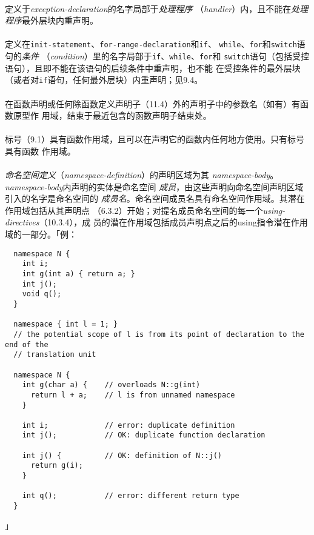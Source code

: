 \paragraph{}
定义于\textit{exception-declaration}的名字局部于\textit{处理程序}
（\textit{handler}）内，且不能在\textit{处理程序}最外层块内重声明。

\paragraph{}
定义在\texttt{init-statement}、\texttt{for-range-declaration}和\texttt{if}、
\texttt{while}、\texttt{for}和\texttt{switch}语句的\textit{条件}
（\textit{condition}）里的名字局部于\texttt{if}、\texttt{while}、\texttt{for}和
\texttt{switch}语句（包括受控语句），且即不能在该语句的后续条件中重声明，也不能
在受控条件的最外层块（或者对\texttt{if}语句，任何最外层块）内重声明；见9.4。

\paragraph{}
在函数声明或任何除函数定义声明子（11.4）外的声明子中的参数名（如有）有函数原型作
用域，结束于最近包含的函数声明子结束处。

\paragraph{}
标号（9.1）具有函数作用域，且可以在声明它的函数内任何地方使用。只有标号具有函数
作用域。

\paragraph{}
\textit{命名空间定义}（\textit{namespace-definition}）的声明区域为其
\textit{namespace-body}。\textit{namespace-body}内声明的实体是命名空间
\textit{成员}，由这些声明向命名空间声明区域引入的名字是命名空间的
\textit{成员名}。命名空间成员名具有命名空间作用域。其潜在作用域包括从其声明点
（6.3.2）开始；对提名成员命名空间的每一个\textit{using-directives}（10.3.4），成
员的潜在作用域包括成员声明点之后的using指令潜在作用域的一部分。「例：
\begin{lstlisting}
  namespace N {
    int i;
    int g(int a) { return a; }
    int j();
    void q();
  }

  namespace { int l = 1; }
  // the potential scope of l is from its point of declaration to the end of the
  // translation unit

  namespace N {
    int g(char a) {    // overloads N::g(int)
      return l + a;    // l is from unnamed namespace
    }

    int i;             // error: duplicate definition
    int j();           // OK: duplicate function declaration

    int j() {          // OK: definition of N::j()
      return g(i);
    }

    int q();           // error: different return type
  }
\end{lstlisting}」

